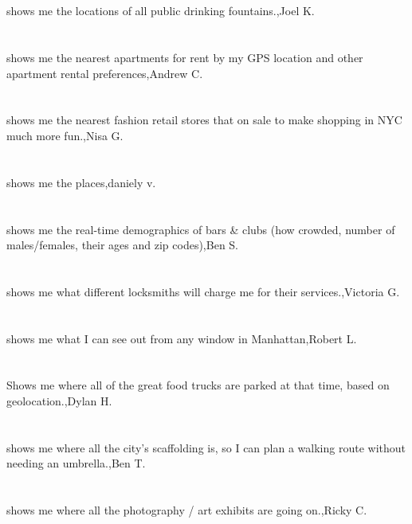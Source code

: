 \section{}shows me the locations of all public drinking fountains.,Joel K.
\section{}shows me the nearest apartments for rent by my GPS location and other apartment rental preferences,Andrew C.
\section{}shows me the nearest fashion retail stores that on sale to make shopping in NYC much more fun.,Nisa G.
\section{}shows me the places,daniely v.
\section{} shows me the real-time demographics of bars \& clubs (how crowded, number of males/females, their ages and zip codes),Ben  S.
\section{}shows me what different locksmiths will charge me for their services.,Victoria G.
\section{} shows me what I can see out from any window in Manhattan,Robert L.
\section{}Shows me where all of the great food trucks are parked at that time, based on geolocation.,Dylan H.
\section{}shows me where all the city's scaffolding is, so I can plan a walking route without needing an umbrella.,Ben T.
\section{}shows me where all the photography / art exhibits are going on.,Ricky C.
